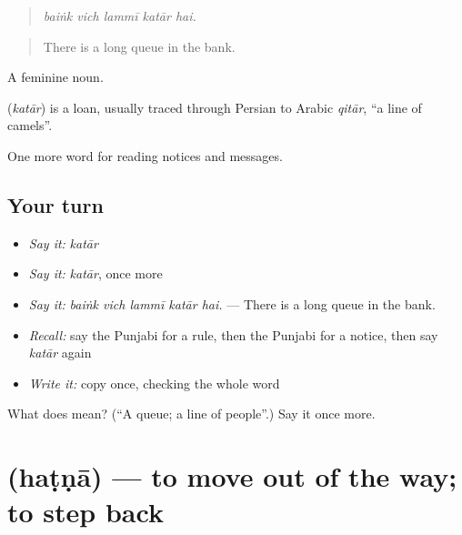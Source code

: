 \begin{quote}
    
\end{quote}

\begin{quote}
\emph{baiṅk vich lammī katār hai.}
\end{quote}

\begin{quote}
There is a long queue in the bank.
\end{quote}

A feminine noun.

\begin{cousinweb}
\textbf{} (\emph{katār}) is a loan, usually traced through Persian to Arabic \emph{qitār}, \textquotedblleft{}a line of camels\textquotedblright{}.
\end{cousinweb}

\begin{grammarlens}[title={What you've built}]
One more word for reading notices and messages.
\end{grammarlens}

\subsection*{Your turn}
\begin{itemize}
\raggedright
  \item \emph{Say it:} \emph{katār}
  \item \emph{Say it:} \emph{katār}, once more
  \item \emph{Say it:} \emph{baiṅk vich lammī katār hai.} — There is a long queue in the bank.
  \item \emph{Recall:} say the Punjabi for a rule, then the Punjabi for a notice, then say \emph{katār} again
  \item \emph{Write it:} copy \textbf{} once, checking the whole word
\end{itemize}

\begin{tcolorbox}[breakable,colback=teal!4,colframe=teal!35!black,title={Before you move on}]
What does  mean? (\textquotedblleft{}A queue; a line of people\textquotedblright{}.) Say it once more.
\end{tcolorbox}
\section[\texorpdfstring{\pa{ਹਟਣਾ} (haṭṇā)}{ਹਟਣਾ (haṭṇā)}]{ (haṭṇā) — to move out of the way; to step back}

